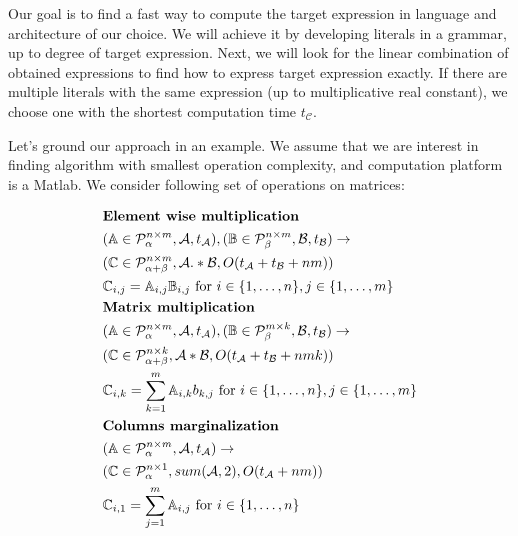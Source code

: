 Our goal is to find a fast way to compute the target expression in
language and architecture of our choice.  We will achieve it by
developing literals in a grammar, up to degree of target
expression. Next, we will look for the linear combination of obtained
expressions to find how to express target expression exactly. If there
are multiple literals with the same expression (up to multiplicative real
constant), we choose one with the shortest computation time $t_\mathcal{C}$.

Let's ground our approach in an example. We assume that we are interest in
finding algorithm with smallest operation complexity, and computation platform
is a Matlab.  We consider following set of operations on matrices: 

\begin{figure}
\begin{framed}
\begin{align*}
&\text{{\bf Element wise multiplication}}\\
&(\mathbb{A} \in \mathcal{P}^{n \times m}_\alpha, \mathcal{A}, t_\mathcal{A}), (\mathbb{B} \in \mathcal{P}^{n \times m}_\beta, \mathcal{B}, t_\mathcal{B}) \rightarrow \\ 
&(\mathbb{C} \in \mathcal{P}^{n \times m}_{\alpha + \beta}, \mathcal{A} .* \mathcal{B}, O(t_\mathcal{A} + t_\mathcal{B} + nm)) \\
&\mathbb{C}_{i,j} = \mathbb{A}_{i,j}\mathbb{B}_{i, j} \text{ for } i \in \{1, \dots, n\}, j \in \{1, \dots, m\} \\
&\text{{\bf Matrix multiplication}}\\
&(\mathbb{A} \in \mathcal{P}^{n \times m}_\alpha, \mathcal{A}, t_\mathcal{A}), (\mathbb{B} \in \mathcal{P}^{m \times k}_\beta, \mathcal{B}, t_\mathcal{B}) \rightarrow \\ 
&(\mathbb{C} \in \mathcal{P}^{n \times k}_{\alpha + \beta}, \mathcal{A} * \mathcal{B}, O(t_\mathcal{A} + t_\mathcal{B} + nmk)) \\
&\mathbb{C}_{i,k} = \sum_{k = 1}^m \mathbb{A}_{i,k}b_{k, j} \text{ for } i \in \{1, \dots, n\}, j \in \{1, \dots, m\} \\
&\text{{\bf Columns marginalization}}\\
&(\mathbb{A} \in \mathcal{P}^{n \times m}_\alpha, \mathcal{A}, t_\mathcal{A}) \rightarrow \\ 
&(\mathbb{C} \in \mathcal{P}^{n \times 1}_\alpha, sum(\mathcal{A}, 2), O(t_\mathcal{A} + nm)) \\
&\mathbb{C}_{i, 1} = \sum_{j = 1}^m \mathbb{A}_{i, j} \text{ for } i \in \{1, \dots, n\}\\

\end{align*}
\end{framed}
\end{figure}
